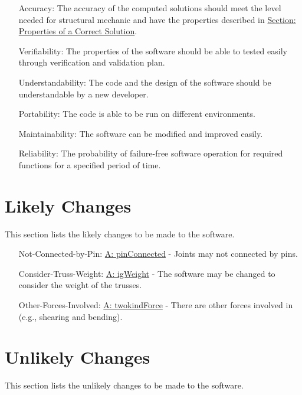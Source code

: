 \documentclass[12pt]{article}
\begin{document}
\begin{itemize}
\item[Accuracy:\phantomsection\label{accurate}]{The accuracy of the computed solutions should meet the level needed for structural mechanic and have the properties described in \hyperref[Sec:CorSolProps]{Section: Properties of a Correct Solution}.}
\item[Verifiability:\phantomsection\label{verifiable}]{The properties of the software should be able to tested easily through verification and validation plan.}
\item[Understandability:\phantomsection\label{understandable}]{The code and the design of the software should be understandable  by a new developer.}
\item[Portability:\phantomsection\label{portable}]{The code is able to be run on different environments.}
\item[Maintainability:\phantomsection\label{maintainable}]{The software can be modified and improved easily.}
\item[Reliability:\phantomsection\label{reliable}]{The probability of failure-free software operation for required functions for a specified period of time.}
\end{itemize}
\section{Likely Changes}
\label{Sec:LCs}
This section lists the likely changes to be made to the software.

\begin{itemize}
\item[Not-Connected-by-Pin:\phantomsection\label{likeChgNCbP}]{\hyperref[pinConnected]{A: pinConnected} -  Joints may not connected by pins.}
\item[Consider-Truss-Weight:\phantomsection\label{likeChgWoT}]{\hyperref[igWeight]{A: igWeight} -  The software may be changed to consider the weight of the trusses.}
\item[Other-Forces-Involved:\phantomsection\label{likeChgOtherF}]{\hyperref[twokindForce]{A: twokindForce} -  There are other forces involved in (e.g., shearing and bending).}
\end{itemize}
\section{Unlikely Changes}
\label{Sec:UCs}
This section lists the unlikely changes to be made to the software.
\end{document}

